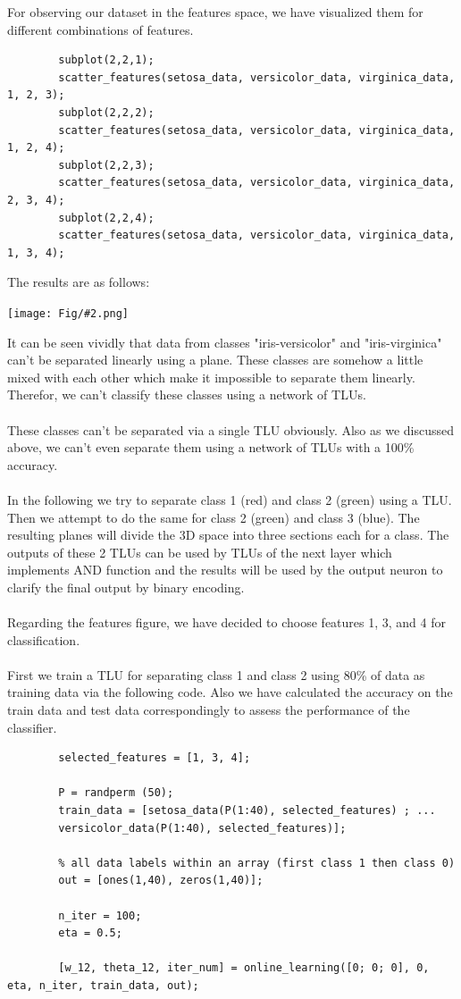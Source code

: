 \documentclass[]{article}
\newcommand{\pict}[2]{\begin{center}
		\texttt{[image: Fig/\#2.png]}
\end{center}}
\begin{document}
	For observing our dataset in the features space, we have visualized them for different combinations of features. 
	\begin{lstlisting}
		subplot(2,2,1);
		scatter_features(setosa_data, versicolor_data, virginica_data, 1, 2, 3);
		subplot(2,2,2);
		scatter_features(setosa_data, versicolor_data, virginica_data, 1, 2, 4);
		subplot(2,2,3);
		scatter_features(setosa_data, versicolor_data, virginica_data, 2, 3, 4);
		subplot(2,2,4);
		scatter_features(setosa_data, versicolor_data, virginica_data, 1, 3, 4);
	\end{lstlisting}
\newpage
	The results are as follows:
	\pict{1}{Q2_F9}
	It can be seen vividly that data from classes "iris-versicolor" and "iris-virginica" can't be separated linearly using a plane. These classes are somehow a little mixed with each other which make it impossible to separate them linearly. Therefor, we can't classify these classes using a network of TLUs.\\\\
	These classes can't be separated via a single TLU obviously. Also as we discussed above, we can't even separate them using a network of TLUs with a 100\% accuracy.\\\\
	In the following we try to separate class 1 (red) and class 2 (green) using a TLU. Then we attempt to do the same for class 2 (green) and class 3 (blue). The resulting planes will divide the 3D space into three sections each for a class. The outputs of these 2 TLUs can be used by TLUs of the next layer which implements AND function and the results will be used by the output neuron to clarify the final output by binary encoding.\\\\
	Regarding the features figure, we have decided to choose features 1, 3, and 4 for classification.\\\\
	First we train a TLU for separating class 1 and class 2 using 80\% of data as training data via the following code. Also we have calculated the accuracy on the train data and test data correspondingly to assess the performance of the classifier.
	\begin{lstlisting}
		selected_features = [1, 3, 4];
		
		P = randperm (50);
		train_data = [setosa_data(P(1:40), selected_features) ; ...
		versicolor_data(P(1:40), selected_features)];
		
		% all data labels within an array (first class 1 then class 0)
		out = [ones(1,40), zeros(1,40)];
		
		n_iter = 100;
		eta = 0.5;
		
		[w_12, theta_12, iter_num] = online_learning([0; 0; 0], 0, eta, n_iter, train_data, out);
		
	\end{lstlisting}
\end{document}
